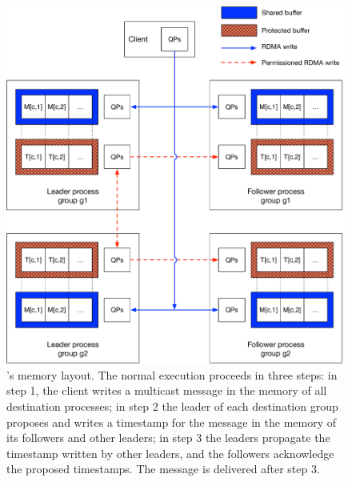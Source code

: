 \begin{figure}[ht!]
  \centering
  \includegraphics[width=1\linewidth]{figures/architecture2}
  \caption{\libname's memory layout. The normal execution proceeds in three steps: in step 1, the client writes a multicast message in the memory of all destination processes; in step 2 the leader of each destination group proposes and writes a timestamp for the message in the memory of its followers and other leaders; in step 3 the leaders propagate the timestamp written by other leaders, and the followers acknowledge the proposed timestamps. The message is delivered after step 3.}
  \label{fig:arch}
\end{figure}


